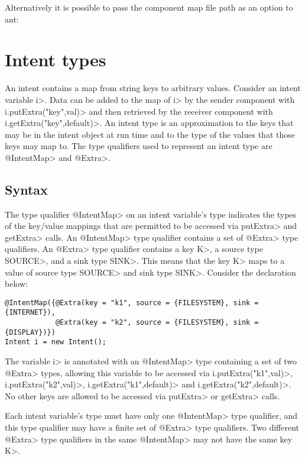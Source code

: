 
\noindent
Alternatively it is possible to pass the component map file path as an option
to ant:


\section{Intent types\label{intent-types}}
An intent contains a map from string keys to arbitrary values. Consider an
intent variable \<i>. Data can be added to the map of \<i> by
the sender component with \<i.putExtra("key",val)> and then retrieved by the
receiver component with \<i.getExtra("key",default)>. An intent type is an
approximation to the keys that may be in the intent object at run time and to
the type of the values that those keys may map to. The type qualifiers used to
represent an intent type are \<@IntentMap> and \<@Extra>.

\subsection{Syntax}
The type qualifier \<@IntentMap> on an intent variable's type indicates the
types of the key/value mappings that are permitted to be accessed via
\<putExtra> and \<getExtra> calls.
An \<@IntentMap> type qualifier contains a set of \<@Extra> type qualifiers. An
\<@Extra> type qualifier contains a key \<K>, a source type \<SOURCE>, and a 
sink type \<SINK>. This means that the key \<K> maps to a value of source type 
\<SOURCE> and sink type \<SINK>. Consider the declaration below:

\begin{Verbatim}
@IntentMap({@Extra(key = "k1", source = {FILESYSTEM}, sink = {INTERNET}),
            @Extra(key = "k2", source = {FILESYSTEM}, sink = {DISPLAY})}) 
Intent i = new Intent();
\end{Verbatim}

The variable \<i> is annotated with an \<@IntentMap> type containing a set of
two \<@Extra> types, allowing this variable to be accessed via
\<i.putExtra("k1",val)>, \<i.putExtra("k2",val)>,
\<i.getExtra("k1",default)> and \<i.getExtra("k2",default)>. No other keys are
allowed to be accessed via \<putExtra> or \<getExtra> calls. 

Each intent variable's type must have only one \<@IntentMap> type qualifier, and
this type qualifier may have a finite set of \<@Extra> type qualifiers. Two
different \<@Extra> type qualifiers in the same \<@IntentMap> may not have the
same key \<K>.

